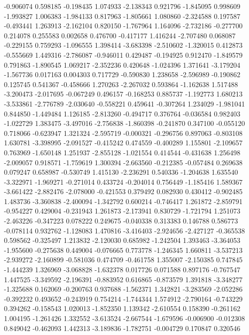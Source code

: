 -0.906074
0.598185
-0.198435
1.074933
-2.138343
0.921796
-1.845095
0.998609
-1.993827
1.006383
-1.984133
0.817963
-1.805661
1.080860
-2.324588
0.197587
-0.493441
1.263913
-2.162104
0.820150
-1.767964
1.164096
-2.732186
-0.277700
0.214078
0.255583
0.002658
0.476700
-0.417177
1.416244
-2.707480
0.068087
-0.229155
0.759293
-1.096555
1.398414
-3.683398
-2.510602
-1.320015
0.412873
-0.555669
1.449316
-2.786087
-0.946011
0.429487
-0.194925
0.912470
-1.849579
0.791863
-1.890545
1.069217
-2.352236
0.420648
-1.024396
1.371641
-3.179204
-1.567736
0.017163
0.004303
0.717729
-0.590830
1.238658
-2.596989
-0.190862
0.125745
0.541367
-0.458666
1.270263
-2.267032
0.593864
-1.162638
1.517488
-3.200473
-2.017695
-0.067249
0.496157
-0.168253
0.885737
-1.192773
1.680213
-3.533861
-2.776789
-2.030640
-0.558221
0.459641
-0.307264
1.234029
-1.981041
0.844850
-1.449484
1.126185
-2.813260
-0.494717
0.376764
-0.036584
0.982403
-1.022729
1.383475
-3.497016
-2.756838
-1.860398
-0.241870
0.347100
-0.055120
0.718066
-0.623947
1.321324
-2.595719
-0.000321
-0.296756
0.897063
-0.803108
1.630781
-3.398995
-2.091527
-0.415242
0.474559
-0.400289
1.155801
-2.109657
0.763969
-1.650148
1.251937
-2.855128
-1.021554
0.414544
-0.431638
1.256498
-2.009057
0.918571
-1.759619
1.300394
-2.663560
-0.212385
-0.057484
0.269638
0.079247
0.658987
-0.530749
1.415130
-2.236291
0.540336
-1.204638
1.635540
-3.322971
-1.969271
-0.271014
0.433724
-0.204014
0.756449
-1.185416
1.589367
-3.661422
-2.882476
-2.078000
-0.421553
0.379492
0.082930
0.430412
-0.902485
1.483736
-3.360838
-2.400094
-1.342792
0.600214
-0.746417
1.261872
-2.859791
-0.954227
0.429004
-0.231943
1.261873
-2.173941
0.830729
-1.721794
1.251073
-2.463226
-0.347223
0.078222
0.249675
-0.040338
0.313383
0.146788
0.586773
-0.078114
0.932762
-1.128083
1.470816
-3.416403
-2.924656
-2.427127
-0.365538
0.598562
-0.325497
1.213832
-2.120030
0.685982
-1.242504
1.393463
-3.364053
-1.955600
-0.275638
0.449004
-0.076665
0.773778
-1.246345
1.660811
-3.537213
-2.939272
-2.160899
-0.581036
0.474709
-0.461758
1.355007
-2.150385
0.747845
-1.444239
1.326969
-3.068828
-1.632378
0.017726
0.071588
0.897176
-0.767547
1.447525
-3.349592
-2.196391
-0.883952
0.616865
-0.873579
1.391818
-3.348277
-1.325688
0.162069
-0.200763
0.937688
-1.562371
1.342821
-3.283569
-2.052286
-0.392232
0.493652
-0.243919
0.754214
-1.744344
1.574912
-2.790164
-0.743229
0.394262
-0.158543
1.020013
-1.852350
1.139342
-2.610554
0.158390
-0.261162
1.004195
-1.261426
1.332552
-3.613524
-2.667544
-1.679596
-0.006900
-0.012308
0.849042
-0.462093
1.442313
-3.189836
-1.782751
-0.004729
0.170847
0.320546
